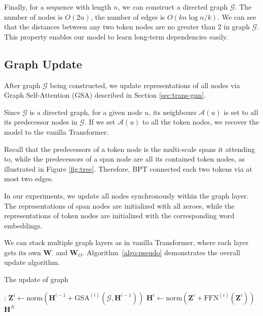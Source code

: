 \documentclass[11pt,a4paper]{article}
\begin{document}
Finally, for a sequence with length $n$,
we can construct a directed graph $\mathcal{G}$. The number of nodes is $O(2n)$, the number of edges is $O(kn\log n/k)$.
We can see that the distances between any two token nodes are no greater than 2 in graph $\mathcal{G}$.
This property enables our model to learn long-term dependencies easily. 

\subsection{Graph Update}


After graph $\mathcal{G}$ being constructed, we update representations of all nodes via Graph Self-Attention (GSA) described in Section \ref{sec:trans-gnn}.

Since $\mathcal{G}$ is a directed graph, for a given node $u$, its neighbours $\mathcal{A}(u)$ is set to all its predecessor nodes in $\mathcal{G}$.
If we set $\mathcal{A}(u)$  to all the token nodes, we recover the model to the vanilla Transformer.

Recall that the predecessors of a token node is the multi-scale spans it attending to, while the predecessors of a span node are all its contained token nodes, as illustrated in Figure \ref{fig:tree}.
Therefore, BPT connected each two tokens via at most two edges.

In our experiments, we update all nodes synchronously within the graph layer.
The representations of span nodes are initialized with all zeroes, while the representations of token nodes are initialized with the corresponding word embeddings.



We can stack multiple graph layers as in vanilla Transformer, where each layer gets its own $\mathbf{W}_\cdot^\cdot$ and $\mathbf{W}_O$.
Algorithm~\ref{algo:pseudo} demonstrates the overall update algorithm.

\begin{algorithm}[!htb]
\caption{The update of graph}
\label{algo:pseudo}
\begin{algorithmic}[1]
:
\State $\mathbf{Z}^i \gets \textrm{norm}\left(\mathbf{H}^{i-1} + \textrm{GSA}^{(i)}\left(\mathcal{G}, \mathbf{H}^{i-1}\right)\right)$
\State $\mathbf{H}^i \gets \textrm{norm}\left(\mathbf{Z}^i + \textrm{FFN}^{(i)}\left(\mathbf{Z}^i\right)\right) $
\EndFor
\State \Return ${\mathbf{H}}^N$
\end{algorithmic}
\end{algorithm}
\end{document}
